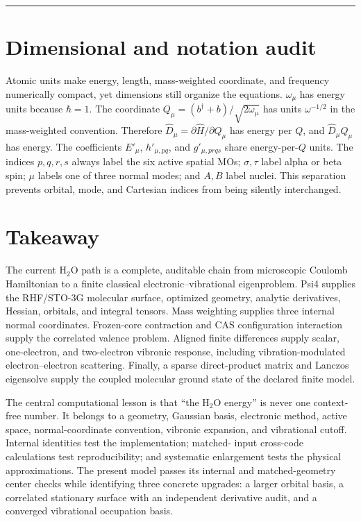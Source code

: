 \documentclass[10pt,twocolumn]{article}
\newcommand{\conceptbreak}{%
  \par\medskip\noindent
  {\color{black!30}\rule{\columnwidth}{0.35pt}}%
  \par\medskip}
\begin{document}
\conceptbreak

\section*{Dimensional and notation audit}

Atomic units make energy, length, mass-weighted coordinate, and frequency
numerically compact, yet dimensions still organize the equations.
$\omega_\mu$ has energy units because $\hbar=1$.  The coordinate
$Q_\mu=(b^\dagger+b)/\sqrt{2\omega_\mu}$ has units $\omega^{-1/2}$ in the
mass-weighted convention.  Therefore $\hat D_\mu=\partial\hat H/\partial Q_\mu$
has energy per $Q$, and $\hat D_\mu Q_\mu$ has energy.  The coefficients
$E'_{\mu}$, $h'_{\mu,pq}$, and $g'_{\mu,prqs}$ share energy-per-$Q$ units.  The
indices $p,q,r,s$ always label the six active spatial MOs; $\sigma,\tau$ label
alpha or beta spin; $\mu$ labels one of three normal modes; and $A,B$ label
nuclei.  This separation prevents orbital, mode, and Cartesian indices from
being silently interchanged.

\section*{Takeaway}

The current H$_2$O path is a complete, auditable chain from microscopic
Coulomb Hamiltonian to a finite classical electronic--vibrational eigenproblem.
Psi4 supplies the RHF/STO-3G molecular surface, optimized geometry, analytic
derivatives, Hessian, orbitals, and integral tensors.  Mass weighting supplies
three internal normal coordinates.  Frozen-core contraction and CAS
configuration interaction supply the correlated valence problem.  Aligned
finite differences supply scalar, one-electron, and two-electron vibronic
response, including vibration-modulated electron--electron scattering.
Finally, a sparse direct-product matrix and Lanczos eigensolve supply the
coupled molecular ground state of the declared finite model.

The central computational lesson is that ``the H$_2$O energy'' is never one
context-free number.  It belongs to a geometry, Gaussian basis, electronic
method, active space, normal-coordinate convention, vibronic expansion, and
vibrational cutoff.  Internal identities test the implementation; matched-
input cross-code calculations test reproducibility; and systematic enlargement
tests the physical approximations.  The present model passes its internal and
matched-geometry center checks while identifying three concrete upgrades: a
larger orbital basis, a correlated stationary surface with an independent
derivative audit, and a converged vibrational occupation basis.
\end{document}
